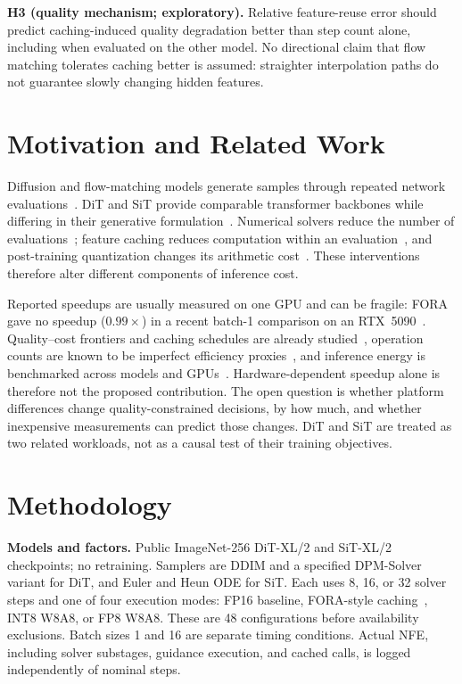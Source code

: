 \documentclass[conference]{IEEEtran}
\begin{document}
\textbf{H3 (quality mechanism; exploratory).} Relative feature-reuse error should predict caching-induced
quality degradation better than step count alone, including when evaluated on the other model. No directional
claim that flow matching tolerates caching better is assumed: straighter interpolation paths do not guarantee
slowly changing hidden features.

\section{Motivation and Related Work}

Diffusion and flow-matching models generate samples through repeated network
evaluations~\cite{ho2020ddpm,lipman2023flow}. DiT and SiT provide comparable transformer backbones while
differing in their generative formulation~\cite{peebles2023dit,ma2024sit}. Numerical solvers reduce the number
of evaluations~\cite{song2021ddim,lu2022dpmsolver}; feature caching reduces computation within an
evaluation~\cite{selvaraju2024fora}, and post-training quantization changes its arithmetic
cost~\cite{wu2024ptq4dit}. These interventions therefore alter different components of inference cost.

Reported speedups are usually measured on one GPU and can be fragile: FORA gave no speedup ($0.99\times$) in
a recent batch-1 comparison on an RTX~5090~\cite{yin2026accelaes}. Quality--cost frontiers and caching
schedules are already studied~\cite{aggarwal2026evocache}, operation counts are known to be imperfect
efficiency proxies~\cite{dehghani2022misnomer}, and inference energy is benchmarked across models and
GPUs~\cite{chung2025mlenergy}. Hardware-dependent speedup alone is therefore not the proposed contribution.
The open question is whether platform differences change quality-constrained decisions, by how much, and
whether inexpensive measurements can predict those changes. DiT and SiT are treated as two related workloads,
not as a causal test of their training objectives.

\section{Methodology}

\textbf{Models and factors.} Public ImageNet-256 DiT-XL/2 and SiT-XL/2 checkpoints; no retraining. Samplers
are DDIM and a specified DPM-Solver variant for DiT, and Euler and Heun ODE for SiT. Each uses 8, 16, or 32
solver steps and one of four execution modes: FP16 baseline, FORA-style caching~\cite{selvaraju2024fora},
INT8 W8A8, or FP8 W8A8. These are 48 configurations before availability exclusions. Batch sizes 1 and 16 are
separate timing conditions. Actual NFE, including solver substages, guidance execution, and cached calls, is
logged independently of nominal steps.
\end{document}
